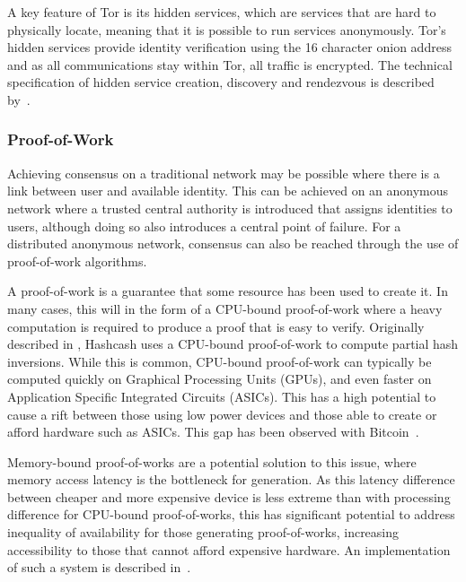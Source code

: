 			A key feature of Tor is its hidden services, which are services that are hard to physically locate, meaning that it is possible to run services anonymously. Tor's hidden services provide identity verification using the 16 character onion address and as all communications stay within Tor, all traffic is encrypted. The technical specification of hidden service creation, discovery and rendezvous is described by~\cite{tor_rend}.
			
		\subsubsection*{Proof-of-Work}
			Achieving consensus on a traditional network may be possible where there is a link between user and available identity. This can be achieved on an anonymous network where a trusted central authority is introduced that assigns identities to users, although doing so also introduces a central point of failure. For a distributed anonymous network, consensus can also be reached through the use of proof-of-work algorithms.
			
			A proof-of-work is a guarantee that some resource has been used to create it. In many cases, this will in the form of a CPU-bound proof-of-work where a heavy computation is required to produce a proof that is easy to verify. Originally described in \cite{back2002hashcash}, Hashcash uses a CPU-bound proof-of-work to compute partial hash inversions. While this is common, CPU-bound proof-of-work can typically be computed quickly on Graphical Processing Units (GPUs), and even faster on Application Specific Integrated Circuits (ASICs). This has a high potential to cause a rift between those using low power devices and those able to create or afford hardware such as ASICs. This gap has been observed with Bitcoin~\cite{peck2013bitcoin}.
			
			Memory-bound proof-of-works are a potential solution to this issue, where memory access latency is the bottleneck for generation. As this latency difference between cheaper and more expensive device is less extreme than with processing difference for CPU-bound proof-of-works, this has significant potential to address inequality of availability for those generating proof-of-works, increasing accessibility to those that cannot afford expensive hardware. An implementation of such a system is described in~\cite{cuckoo}.
